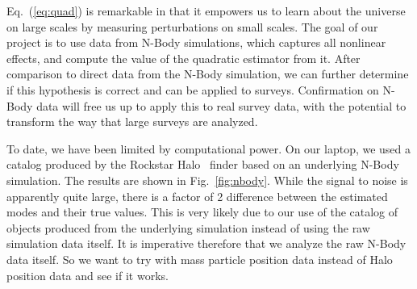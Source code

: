 \documentclass[12pt]{article}
\newcommand{\rf}[1]{\ref{fig:#1}}
\newcommand{\ec}[1]{Eq.~(\ref{eq:#1})}
\begin{document}
\begin{small}
\ec{quad} is remarkable in that it empowers us to learn about the universe on large scales by measuring perturbations on small scales. 
The goal of our project is to use data from N-Body simulations, which captures all nonlinear effects, and compute the value of the quadratic estimator from it. After comparison to direct data from the N-Body simulation, we can further determine if this hypothesis is correct and can be applied to surveys. Confirmation on N-Body data will free us up to apply this to real survey data, with the potential to transform the way that large surveys are analyzed.


To date, we have been limited by computational power. On our laptop, we used a catalog produced by the Rockstar Halo~\cite{2013ApJ...762..109B} finder based on an underlying N-Body simulation. The results are shown in Fig.~\rf{nbody}. While the signal to noise is apparently quite large, there is a factor of 2 difference between the estimated modes and their true values. This is very likely due to our use of the catalog of objects produced from the underlying simulation instead of using the raw simulation data itself. It is imperative therefore that we analyze the raw N-Body data itself.
So we want to try with mass particle position data instead of Halo position data and see if it works. \\


\end{small}
\end{document}
